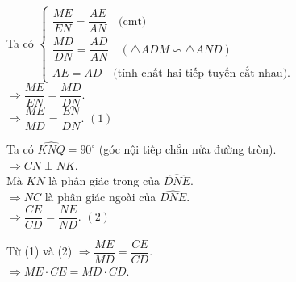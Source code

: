 \begin{ex}
\begin{enumerate}
		Ta có $\begin{cases}
		\dfrac{ME}{EN}=\dfrac{AE}{AN} \quad \text{(cmt)}\\
		\dfrac{MD}{DN}=\dfrac{AD}{AN} \quad (\triangle ADM \backsim \triangle AND)\\
		AE=AD \quad \text{(tính chất hai tiếp tuyến cắt nhau)}.
		\end{cases}$\\
		$\Rightarrow \dfrac{ME}{EN}=\dfrac{MD}{DN}$.\\
		$\Rightarrow \dfrac{ME}{MD}=\dfrac{EN}{DN}$. \hfill $(1)$
		
		Ta có $\widehat{KNQ} = 90^\circ$ (góc nội tiếp chắn nửa đường tròn).\\
		$\Rightarrow CN \perp NK$.\\
		Mà $KN$ là phân giác trong của $\widehat{DNE}$.\\
		$\Rightarrow NC$ là phân giác ngoài của $\widehat{DNE}$.\\
		$\Rightarrow \dfrac{CE}{CD}=\dfrac{NE}{ND}$. \hfill $(2)$
		
		Từ (1) và (2) $\Rightarrow \dfrac{ME}{MD}=\dfrac{CE}{CD}$.\\
		$\Rightarrow ME \cdot CE=MD \cdot CD$.
	\end{enumerate}
\end{ex}
